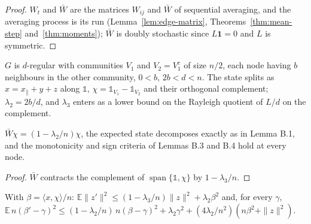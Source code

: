\begin{proof}\leanok
$W_t$ and $\bar W$ are the matrices $W_{ij}$ and $\bar W$ of sequential averaging, and the
averaging process is its run (Lemma~\ref{lem:edge-matrix}, Theorems~\ref{thm:mean-step}
and~\ref{thm:moments}); $\bar W$ is doubly stochastic since $L\mathbf 1=0$ and $L$ is symmetric.
\end{proof}
\begin{definition}\label{def:opp-clustered}
\leanok
$G$ is $d$-regular with communities $V_1$ and $V_2=V_1^c$ of size $n/2$, each node having $b$
neighbours in the other community, $0<b$, $2b<d<n$. The state splits as $x=x_\parallel+y+z$ along
$\mathbb 1$, $\chi=\mathbb 1_{V_1}-\mathbb 1_{V_2}$ and their orthogonal complement;
$\lambda_2=2b/d$, and $\lambda_3$ enters as a lower bound on the Rayleigh quotient of $L/d$ on
the complement.
\end{definition}
\begin{theorem}\label{thm:opp-31}
\leanok{}
$\bar W\chi=(1-\lambda_2/n)\chi$, the expected state decomposes exactly as in Lemma B.1, and the
monotonicity and sign criteria of Lemmas B.3 and B.4 hold at every node.
\end{theorem}
\begin{proof}\leanok
$\bar W$ contracts the complement of $\operatorname{span}\{\mathbb 1,\chi\}$ by
$1-\lambda_3/n$.
\end{proof}
\begin{lemma}\label{lem:opp-onestep}
\leanok{}
With $\beta=\langle x,\chi\rangle/n$: $\mathbb E\|z'\|^2\le(1-\lambda_3/n)\|z\|^2+\lambda_2\beta^2$ and,
for every $\gamma$, $\mathbb E\,n(\beta'-\gamma)^2\le(1-\lambda_2/n)\,n(\beta-\gamma)^2+\lambda_2\gamma^2
+(4\lambda_2/n^2)(n\beta^2+\|z\|^2)$.
\end{lemma}
